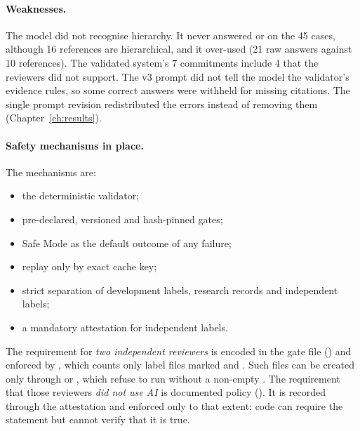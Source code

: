 \paragraph{Weaknesses.} The model did not recognise hierarchy. It never answered \PA{} or \CH{} on the 45 cases, although 16 references are hierarchical, and it over-used \SC{} (21 raw \SC{} answers against 10 \SC{} references). The validated system's 7 \SC{} commitments include 4 that the reviewers did not support. The v3 prompt did not tell the model the validator's evidence rules, so some correct answers were withheld for missing citations. The single prompt revision redistributed the errors instead of removing them (Chapter~\ref{ch:results}).

\paragraph{Safety mechanisms in place.} The mechanisms are:
\begin{itemize}
    \item the deterministic validator;
    \item pre-declared, versioned and hash-pinned gates;
    \item Safe Mode as the default outcome of any failure;
    \item replay only by exact cache key;
    \item strict separation of development labels, research records and independent labels;
    \item a mandatory attestation for independent labels.
\end{itemize}

The requirement for \emph{two independent reviewers} is encoded in the gate file () and enforced by , which counts only label files marked  and . Such files can be created only through  or , which refuse to run without a non-empty . The requirement that those reviewers \emph{did not use AI} is documented policy (). It is recorded through the attestation and enforced only to that extent: code can require the statement but cannot verify that it is true.
